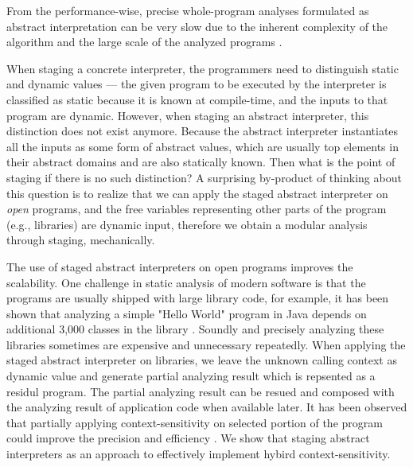 

From the performance-wise, precise whole-program analyses formulated as abstract 
interpretation can be very slow due to the inherent complexity of the algorithm and the large scale 
of the analyzed programs \cite{toman_et_al:LIPIcs:2017:7121}. 

When staging a concrete interpreter, the programmers need to distinguish 
static and dynamic values --- the given program to be executed by the 
interpreter is classified as static because it is known at compile-time, 
and the inputs to that program are dynamic.  However, when staging an 
abstract interpreter, this distinction does not exist anymore. Because the 
abstract interpreter instantiates all the inputs as some form of abstract 
values, which are usually top elements in their abstract domains and are 
also statically known. 
Then what is the point of staging if there is no such distinction?
A surprising by-product of thinking about this question is to realize that 
we can apply the staged abstract interpreter on \textit{open} programs, and
the free variables representing other parts of the program (e.g., libraries) 
are dynamic input, therefore we obtain a modular analysis through staging, 
mechanically. 

The use of staged abstract interpreters on open programs improves the scalability. 
One challenge in static analysis of modern software is that the programs are usually 
shipped with large library code, for example, it has been shown that analyzing a simple
"Hello World" program in Java depends on additional 3,000 classes in the library \cite{DBLP:conf/oopsla/KulkarniMZN16}.
Soundly and precisely analyzing these libraries sometimes are expensive and unnecessary repeatedly.
When applying the staged abstract interpreter on libraries, we leave the unknown 
calling context as dynamic value and generate partial analyzing result which is 
repsented as a residul program. The partial analyzing result can be resued and composed
with the analyzing result of application code when available later. 
It has been observed that partially applying context-sensitivity on selected portion of the program could
improve the precision and efficiency \cite{zipper2018, Kastrinis:2013:HCP:2491956.2462191}. 
We show that staging abstract interpreters as an approach to effectively implement hybird context-sensitivity\todo{}.

